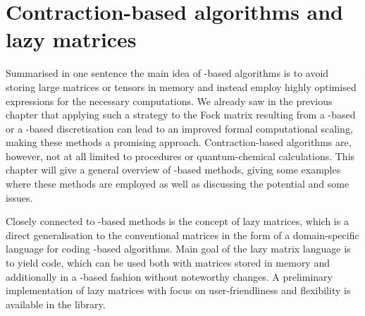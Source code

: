 \chapter{Contraction-based algorithms and lazy matrices}
\label{ch:LazyMatrices}
%
%

\noindent
Summarised in one sentence the main idea of \contraction-based algorithms
is to avoid storing large matrices or tensors in memory
and instead employ highly optimised
\contraction expressions for the necessary computations.
We already saw in the previous chapter that applying
such a strategy to the Fock matrix resulting from a \FE-based
or a \CS-based discretisation
can lead to an improved formal computational scaling,
making these methods a promising approach.
Contraction-based algorithms are, however,
not at all limited to \SCF procedures or quantum-chemical calculations.
This chapter will give a general overview
of \contraction-based methods,
giving some examples where these methods are employed
as well as discussing the potential and some issues.

Closely connected to \contraction-based methods is the concept of lazy matrices,
which is a direct generalisation to the conventional matrices
in the form of a domain-specific language
for coding \contraction-based algorithms.
Main goal of the lazy matrix language is to yield code,
which can be used both with matrices stored in memory
and additionally in a \contraction-based fashion without noteworthy changes.
A preliminary \cpp implementation of lazy matrices
with focus on user-friendliness and flexibility
is available in the \lazyten library.



